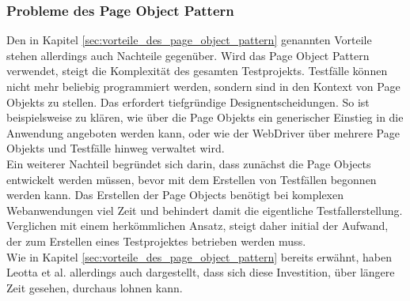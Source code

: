 \subsubsection{Probleme des Page Object Pattern}
\label{sec:probleme_des_page_object_pattern}

Den in Kapitel \ref{sec:vorteile_des_page_object_pattern} genannten Vorteile stehen allerdings auch Nachteile gegenüber. Wird das Page Object Pattern verwendet, steigt die Komplexität des gesamten Testprojekts. Testfälle können nicht mehr beliebig programmiert werden, sondern sind in den Kontext von Page Objekts zu stellen. Das erfordert tiefgründige Designentscheidungen. So ist beispielsweise zu klären, wie über die Page Objekts ein generischer Einstieg in die Anwendung angeboten werden kann, oder wie der WebDriver über mehrere Page Objekts und Testfälle hinweg verwaltet wird.\\
Ein weiterer Nachteil begründet sich darin, dass zunächst die Page Objects entwickelt werden müssen, bevor mit dem Erstellen von Testfällen begonnen werden kann. Das Erstellen der Page Objects benötigt bei komplexen Webanwendungen viel Zeit und behindert damit die eigentliche Testfallerstellung.\\
Verglichen mit einem herkömmlichen Ansatz, steigt daher initial der Aufwand, der zum Erstellen eines Testprojektes betrieben werden muss.\\
Wie in Kapitel \ref{sec:vorteile_des_page_object_pattern} bereits erwähnt, haben 
Leotta et al. \cite{leotta_repairing_2013} allerdings auch dargestellt, dass sich diese Investition, über längere Zeit gesehen, durchaus lohnen kann.
